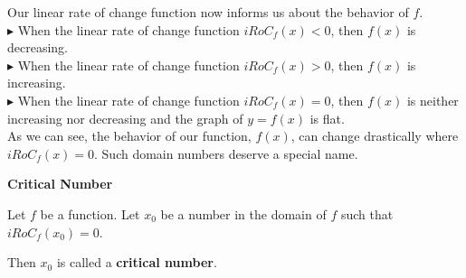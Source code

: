 \documentclass{ximera}
\begin{document}
\begin{image}
\end{image}
Our linear rate of change function now informs us about the behavior of $f$. \\


$\blacktriangleright$ When the linear rate of change function $iRoC_f(x) < 0$, then $f(x)$ is decreasing. \\

$\blacktriangleright$ When the linear rate of change function $iRoC_f(x) > 0$, then $f(x)$ is increasing. \\

$\blacktriangleright$ When the linear rate of change function $iRoC_f(x) = 0$, then $f(x)$ is neither increasing nor decreasing and the graph of $y = f(x)$ is flat. \\


As we can see, the behavior of our function, $f(x)$, can change drastically where $iRoC_f(x) = 0$.  Such domain numbers deserve a special name.



\begin{definition} \textbf{\textcolor{green!50!black}{Critical Number}}  


Let $f$ be a function. Let $x_0$ be a number in the domain of $f$ such that $iRoC_f(x_0) = 0$.

Then $x_0$ is called a \textbf{critical number}.


\end{definition}
\end{document}
